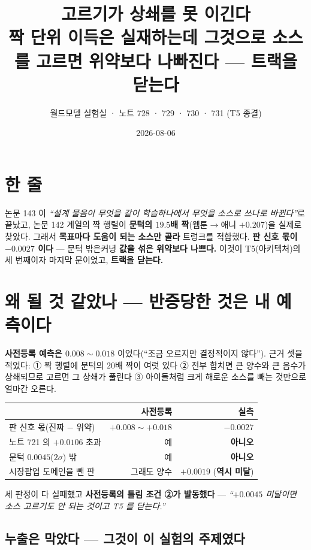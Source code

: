 \documentclass[10pt,a4paper]{article}
\title{\bfseries 고르기가 상쇄를 못 이긴다\\[2pt]
\large 짝 단위 이득은 실재하는데 그것으로 소스를 고르면 위약보다 나빠진다 --- 트랙을 닫는다}
\author{월드모델 실험실 · 노트 728 · 729 · 730 · 731 (T5 종결)}
\date{2026-08-06}
\begin{document}
\maketitle

\section{한 줄}

논문 143 이 \emph{``설계 물음이 무엇을 같이 학습하나에서 무엇을 소스로
쓰나로 바뀐다''}로 끝났고, 논문 142 계열의 짝 행렬이 \textbf{문턱의 $19.5$배
짝}(웹툰$\to$애니 $+0.207$)을 실제로 찾았다. 그래서 \textbf{목표마다 도움이 되는
소스만 골라} 트렁크를 적합했다. \textbf{판 신호 몫이 $\mathbf{-0.0027}$ 이다} ---
문턱 밖은커녕 \textbf{값을 섞은 위약보다 나쁘다.} 이것이 T5(아키텍처)의 세 번째이자
마지막 문이었고, \textbf{트랙을 닫는다.}

\section{왜 될 것 같았나 --- 반증당한 것은 내 예측이다}

\textbf{사전등록 예측은 $0.008 \sim 0.018$} 이었다(``조금 오르지만 결정적이지
않다''). 근거 셋을 적었다: ① 짝 행렬에 문턱의 $20$배 짝이 여럿 있다 ② 전부 합치면
큰 양수와 큰 음수가 상쇄되므로 고르면 그 상쇄가 풀린다 ③ 아이돌처럼 크게 해로운
소스를 빼는 것만으로 얼마간 오른다.

\begin{center}
\begin{tabular}{lrr}
\toprule
& 사전등록 & \textbf{실측} \\
\midrule
판 신호 몫(진짜 $-$ 위약) & $+0.008 \sim +0.018$ & $\mathbf{-0.0027}$ \\
노트 721 의 $+0.0106$ 초과 & 예 & \textbf{아니오} \\
문턱 $0.0045$($2\sigma$) 밖 & 예 & \textbf{아니오} \\
시장팝업 도메인을 뺀 판 & 그래도 양수 & $+0.0019$ (\textbf{역시 미달}) \\
\bottomrule
\end{tabular}
\end{center}

세 판정이 다 실패했고 \textbf{사전등록의 틀림 조건 ②가 발동했다} ---
\emph{``$+0.0045$ 미달이면 소스 고르기도 안 되는 것이고 T5 를 닫는다.''}

\subsection*{누출은 막았다 --- 그것이 이 실험의 주제였다}
\end{document}
